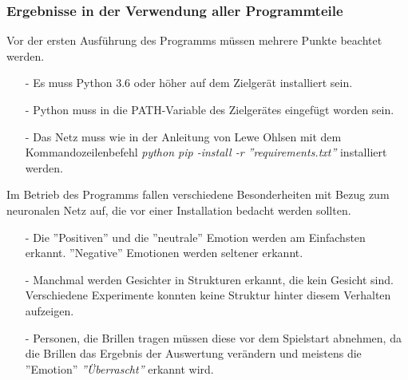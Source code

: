 \documentclass[10pt,a4paper]{report}
\begin{document}
\subsubsection{Ergebnisse in der Verwendung aller Programmteile}
Vor der ersten Ausf\"{u}hrung des Programms m\"{u}ssen mehrere Punkte beachtet werden.
\begin{itemize}
\item[-] Es muss Python 3.6 oder h\"{o}her auf dem Zielger\"{a}t installiert sein.
\item[-] Python muss in die PATH-Variable des Zielger\"{a}tes eingef\"{u}gt worden sein.
\item[-] Das Netz muss wie in der Anleitung\cite{LeweOhlsenGit} von Lewe Ohlsen mit dem Kommandozeilenbefehl \textit{python pip -install -r ''requirements.txt''} installiert werden.
\end{itemize} 
Im Betrieb des Programms fallen verschiedene Besonderheiten mit Bezug zum neuronalen Netz auf, die vor einer Installation bedacht werden sollten.
\begin{itemize}
\item[-] Die ''Positiven'' und die ''neutrale'' Emotion werden am Einfachsten erkannt. ''Negative'' Emotionen werden seltener erkannt.
\item[-] Manchmal werden Gesichter in Strukturen erkannt, die kein Gesicht sind. Verschiedene Experimente konnten keine Struktur hinter diesem Verhalten aufzeigen.
\item[-] Personen, die Brillen tragen m\"{u}ssen diese vor dem Spielstart abnehmen, da die Brillen das Ergebnis der Auswertung ver\"{a}ndern und meistens die ''Emotion'' \textit{''\"{U}berrascht''} erkannt wird. 
\end{itemize}
\end{document}
